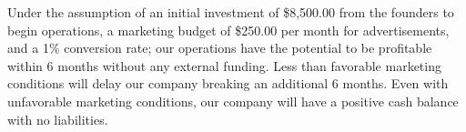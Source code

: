 Under the assumption of an initial investment of \$8,500.00 from the founders to begin operations, a marketing budget of \$250.00 per month for advertisements, and a 1\% conversion rate; our operations have the potential to be profitable within 6 months without any external funding. Less than favorable marketing conditions will delay our company breaking an additional 6 months. Even with unfavorable marketing conditions, our company will have a positive cash balance with no liabilities.





